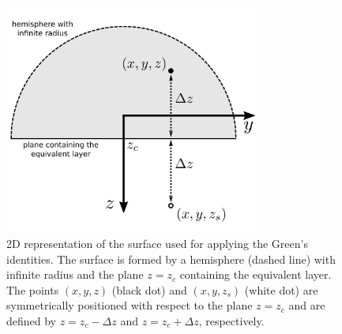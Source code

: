 
\begin{figure}
	\centering
	\includegraphics[width=0.75\textwidth]{Fig/surface_Green}
	\caption{2D representation of the surface used for applying the Green's 
	identities. The surface is formed by a hemisphere (dashed line) with infinite
	radius and the plane $z = z_{c}$ containing the equivalent layer. 
	The points $(x, y, z)$ (black dot) and $(x, y, z_{s})$ (white dot) are 
	symmetrically positioned with respect to the plane $z = z_{c}$ and are
	defined by $z = z_{c} - \Delta z$ and $z = z_{c} + \Delta z$, respectively.}
	\label{fig:surface_Green}
\end{figure}